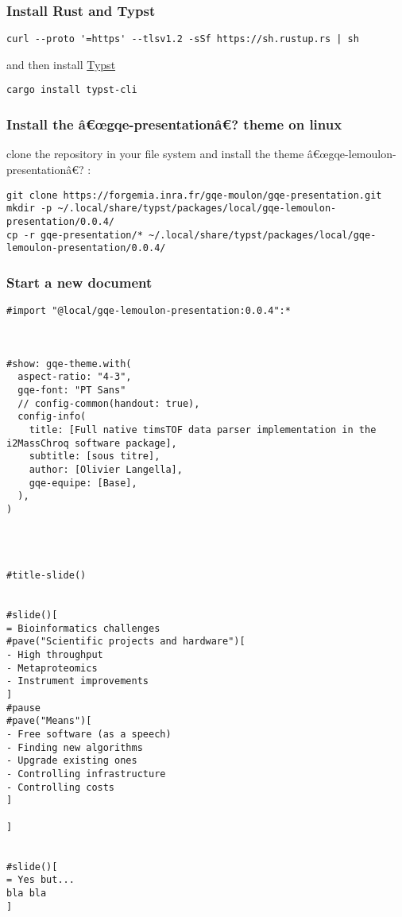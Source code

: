 \subsubsection{Install Rust and Typst}\label{install-rust-and-typst}

\begin{verbatim}
curl --proto '=https' --tlsv1.2 -sSf https://sh.rustup.rs | sh
\end{verbatim}

and then install
\href{https://github.com/typst/typst\#installation}{Typst}

\begin{verbatim}
cargo install typst-cli
\end{verbatim}

\subsubsection{Install the â€œgqe-presentationâ€? theme on
linux}\label{install-the-uxe2ux153gqe-presentationuxe2-theme-on-linux}

clone the repository in your file system and install the theme
â€œgqe-lemoulon-presentationâ€? :

\begin{verbatim}
git clone https://forgemia.inra.fr/gqe-moulon/gqe-presentation.git
mkdir -p ~/.local/share/typst/packages/local/gqe-lemoulon-presentation/0.0.4/
cp -r gqe-presentation/* ~/.local/share/typst/packages/local/gqe-lemoulon-presentation/0.0.4/
\end{verbatim}

\subsubsection{Start a new document}\label{start-a-new-document}

\begin{verbatim}
#import "@local/gqe-lemoulon-presentation:0.0.4":*



#show: gqe-theme.with(
  aspect-ratio: "4-3",
  gqe-font: "PT Sans"
  // config-common(handout: true),
  config-info(
    title: [Full native timsTOF data parser implementation in the i2MassChroq software package],
    subtitle: [sous titre],
    author: [Olivier Langella],
    gqe-equipe: [Base],
  ),
)




#title-slide()


#slide()[
= Bioinformatics challenges
#pave("Scientific projects and hardware")[
- High throughput
- Metaproteomics
- Instrument improvements
]
#pause
#pave("Means")[
- Free software (as a speech)
- Finding new algorithms
- Upgrade existing ones
- Controlling infrastructure
- Controlling costs
]

]


#slide()[
= Yes but...
bla bla
]
\end{verbatim}

